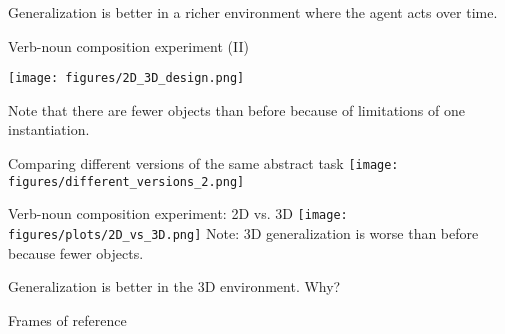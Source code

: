 \documentclass{beamer}
\begin{document}
\begin{frame}[standout]
Generalization is better in a richer environment where the agent acts over time.
\end{frame}

\begin{frame}{Verb-noun composition experiment (II)}
\begin{center}
\texttt{[image: figures/2D\_3D\_design.png]}
\end{center}
Note that there are fewer objects than before because of limitations of one instantiation.
\end{frame}

\begin{frame}{Comparing different versions of the same abstract task}
\centering
\texttt{[image: figures/different\_versions\_2.png]}
\end{frame}

\begin{frame}{Verb-noun composition experiment: 2D vs. 3D}
\texttt{[image: figures/plots/2D\_vs\_3D.png]}
{\small Note: 3D generalization is worse than before because fewer objects.}
\end{frame}

\begin{frame}[standout]
Generalization is better in the 3D environment. Why?
\end{frame}

\begin{frame}{Frames of reference}
\end{frame}
\end{document}
